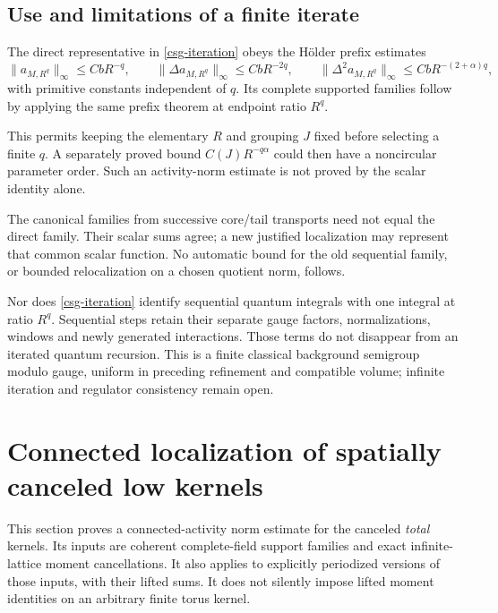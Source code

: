 \documentclass[11pt]{article}
\theoremstyle{remark}
\begin{document}
\subsection{Use and limitations of a finite iterate}
\label{csg-scope-section}

The direct representative in \eqref{csg-iteration} obeys
the H\"older prefix estimates
\begin{equation}
 \|a_{M,R^q}\|_\infty\le CbR^{-q},\qquad
 \|\Delta a_{M,R^q}\|_\infty\le CbR^{-2q},\qquad
 \|\Delta^2a_{M,R^q}\|_\infty
                         \le CbR^{-(2+\alpha)q},
 \label{csg-iterated-scales}
\end{equation}
with primitive constants independent of $q$. Its complete
supported families follow by applying the same prefix
theorem at endpoint ratio $R^q$.

This permits keeping the elementary $R$ and grouping $J$
fixed before selecting a finite $q$. A separately proved
bound $C(J)R^{-q\alpha}$ could then have a noncircular
parameter order. Such an activity-norm estimate is not
proved by the scalar identity alone.

The canonical families from successive core/tail
transports need not equal the direct family. Their scalar
sums agree; a new justified localization may represent
that common scalar function. No automatic bound for the
old sequential family, or bounded relocalization on a
chosen quotient norm, follows.

Nor does \eqref{csg-iteration} identify sequential quantum
integrals with one integral at ratio $R^q$. Sequential
steps retain their separate gauge factors, normalizations,
windows and newly generated interactions. Those terms do
not disappear from an iterated quantum recursion. This
is a finite classical background semigroup modulo gauge,
uniform in preceding refinement and compatible volume;
infinite iteration and regulator consistency remain open.

\section{Connected localization of spatially canceled low kernels}
\label{lst-section}

This section proves a connected-activity norm estimate for the
canceled \emph{total} kernels. Its inputs are coherent complete-field
support families and exact infinite-lattice moment cancellations.
It also applies to explicitly periodized versions of those inputs,
with their lifted sums. It does not silently impose lifted moment
identities on an arbitrary finite torus kernel.
\end{document}
